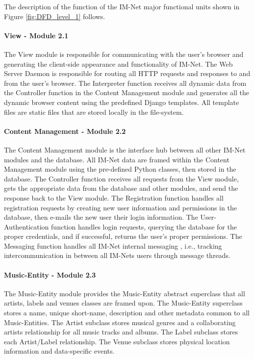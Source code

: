 \documentclass[letterpaper,12pt]{article}
\begin{document}
{The description of the function of the IM-Net major functional units shown in Figure \ref{fig:DFD_level_1} follows.

\paragraph{View - Module 2.1}
The View module is responsible for communicating with the user's browser and generating the client-side appearance and functionality of IM-Net. The Web Server Daemon is responsible for routing all HTTP requests and responses to and from the user's browser. The Interpreter function receives all dynamic data from the Controller function in the Content Management module and generates all the dynamic browser content using the predefined Django templates. All template files are static files that are stored locally in the file-system.

\paragraph{Content Management - Module 2.2}
The Content Management module is the interface hub between all other IM-Net modules and the database. All IM-Net data are framed within the Content Management module using the pre-defined Python classes, then stored in the database. The Controller function receives all requests from the View module, gets the appropriate data from the database and other modules, and send the response back to the View module. The Registration function handles all registration requests by creating new user information and permissions in the database, then e-mails the new user their login information. The User-Authentication function handles login requests, querying the database for the proper credentials, and if successful, returns the user's proper permissions. The Messaging function handles all IM-Net internal messaging , i.e., tracking intercommunication in between all IM-Nets users through message threads.

\paragraph{Music-Entity - Module 2.3}
The Music-Entity module provides the Music-Entity abstract superclass that all artists, labels and venues classes are framed upon. The Music-Entity superclass stores a name, unique short-name, description and other metadata common to all Music-Entities. The Artist subclass stores musical genres and a collaborating artists relationship for all music tracks and albums. The Label subclass stores each Artist/Label relationship. The Venue subclass stores physical location information and data-specific events.

}
\end{document}
